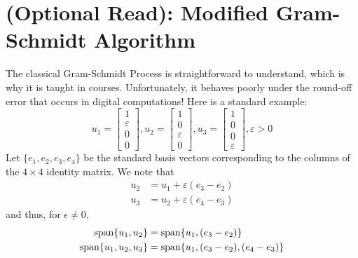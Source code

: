 \section{(Optional Read): Modified Gram-Schmidt Algorithm} 
\label{sec:ModifiedGramSchmidt}

The classical Gram-Schmidt Process is straightforward to understand, which is why it is taught in courses. Unfortunately, it behaves poorly under the round-off error that occurs in digital computations!  Here is a standard example:
    \begin{equation*}
        u_1=\left[\begin{matrix} 1 \\ \varepsilon \\ 0 \\ 0 \end{matrix}\right],
        u_2=\left[\begin{matrix} 1 \\ 0 \\ \varepsilon \\ 0 \end{matrix}\right],
        u_3=\left[\begin{matrix} 1 \\ 0 \\ 0 \\ \varepsilon \end{matrix}\right],
        \varepsilon>0
    \end{equation*}
    Let $\{e_1,e_2,e_3,e_4\}$ be the standard basis vectors corresponding to the columns of the $4 \times 4$ identity matrix. We note that
    \begin{align*}
        u_2 &= u_1+\varepsilon(e_3-e_2)\\
        u_3 &= u_2+\varepsilon(e_4-e_3)
    \end{align*}
    and thus, for $\epsilon \neq 0,$
    \begin{align*}
        \mathrm{span} \{ u_1,u_2 \}&=\mathrm{span} \{ u_1,(e_3-e_2) \}\\
        \mathrm{span} \{ u_1,u_2,u_3 \}&=\mathrm{span} \{ u_1,(e_3-e_2),(e_4-e_3) \}
    \end{align*}

